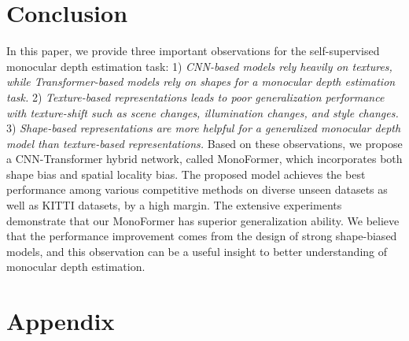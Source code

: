 \documentclass[letterpaper]{article} \usepackage{aaai23}  \usepackage{times}  \usepackage{helvet}  \usepackage{courier}  \usepackage[hyphens]{url}  \usepackage{graphicx} \urlstyle{rm} \def\UrlFont{\rm}  \usepackage{natbib}  \usepackage{caption} \frenchspacing  \setlength{\pdfpagewidth}{8.5in} \setlength{\pdfpageheight}{11in} \usepackage{algorithm}
\begin{document}
\section{Conclusion}
\label{conclusion}
\begin{table}[t]
    \centering
    \caption{\textbf{Ablation study on ACM and FFD.} Both is with ACM and FFD.}
    \label{table_result_modules}
\end{table}
In this paper, we provide three important observations for the self-supervised monocular depth estimation task: 1) \textit{ CNN-based models rely heavily on textures, while Transformer-based models rely on shapes for a monocular depth estimation task.} 2) \textit{Texture-based representations leads to poor generalization performance with texture-shift such as scene changes, illumination changes, and style changes.} 3) \textit{Shape-based representations are more helpful for a generalized monocular depth model than texture-based representations.}
Based on these observations, we propose a CNN-Transformer hybrid network, called MonoFormer, which incorporates both shape bias and spatial locality bias. The proposed model achieves the best performance among various competitive methods on diverse unseen datasets as well as KITTI datasets, by a high margin. The extensive experiments demonstrate that our MonoFormer has superior generalization ability.
We believe that the performance improvement comes from the design of strong shape-biased models, and this observation can be a useful insight to better understanding of monocular depth estimation. 

\appendix



\section{Appendix}
\end{document}
